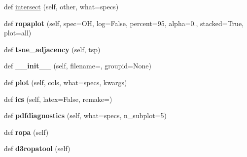 \begin{DoxyCompactItemize}
\item 
def \mbox{\hyperlink{classexplore__dsmacc_1_1new_acc9266b7b7ae7a41e337bd755288a60b}{intersect}} (self, other, what=\textquotesingle{}specs\textquotesingle{})
\item 
\mbox{\label{classexplore__dsmacc_1_1new_a95e1201474c4b697559368bec1a73cbf}} 
def {\bfseries ropaplot} (self, spec=\textquotesingle{}OH\textquotesingle{}, log=False, percent=95, alpha=0., stacked=True, plot=\textquotesingle{}all\textquotesingle{})
\item 
\mbox{\label{classexplore__dsmacc_1_1new_a8f2641f03077e250f338cc828e45cdca}} 
def {\bfseries tsne\+\_\+adjacency} (self, tsp)
\item 
\mbox{\label{classexplore__dsmacc_1_1new_ac9a5be252fe5fa62492d22f6adccfc4a}} 
def {\bfseries \+\_\+\+\_\+init\+\_\+\+\_\+} (self, filename=\textquotesingle{}\textquotesingle{}, groupid=None)
\item 
\mbox{\label{classexplore__dsmacc_1_1new_a7efa1d2712e07026a2189a895c8489c9}} 
def {\bfseries plot} (self, cols, what=\textquotesingle{}specs\textquotesingle{}, kwargs)
\item 
\mbox{\label{classexplore__dsmacc_1_1new_a7415743a1f3ea1b8a10936b3b62dfdaf}} 
def {\bfseries ics} (self, latex=False, remake=\textquotesingle{}\textquotesingle{})
\item 
\mbox{\label{classexplore__dsmacc_1_1new_ae48303d87d4152d431dba936080030f7}} 
def {\bfseries pdfdiagnostics} (self, what=\textquotesingle{}specs\textquotesingle{}, n\+\_\+subplot=5)
\item 
\mbox{\label{classexplore__dsmacc_1_1new_aa50b9538f587f469ba1a265bf287929f}} 
def {\bfseries ropa} (self)
\item 
\mbox{\label{classexplore__dsmacc_1_1new_a9d3e99e661c4e1ab0e7ed61403678c91}} 
def {\bfseries d3ropatool} (self)
\item 
\mbox{\label{classexplore__dsmacc_1_1new_ae5c9611c4206460e36cd8a49340bc300}} 

\end{DoxyCompactItemize}
